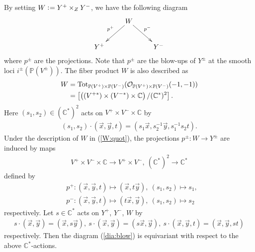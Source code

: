 \documentclass[11pt]{amsart}
\theoremstyle{plain}
\newcommand{\oO}{\mathcal{O}}
\begin{document}
By setting $W \cneq Y^+ \times_{Z} Y^-$, 
we have the following diagram
\begin{align}\label{dia:blow}
\xymatrix{
& W \ar[ld]_-{p^+} \ar[rd]^-{p^-} & \\
Y^+ & & Y^-
}
\end{align}
where $p^{\pm}$ are the projections. 
Note that $p^{\pm}$ are the blow-ups 
of $Y^{\pm}$
at the smooth loci
$i^{\pm}(\mathbb{P}(V^{\pm}))$. 
The fiber product $W$ is also described as 
\begin{align}\notag
W 
&=\mathrm{Tot}_{\mathbb{P}(V^+) \times \mathbb{P}(V^-)}(\oO_{\mathbb{P}(V^+) \times \mathbb{P}(V^-)}(-1, -1)) \\
\label{W:quot}
&=\left[ \left( (V^{+\ast} ) \times (V^{-\ast}) 
\times \mathbb{C} \right)/(\mathbb{C}^{\ast})^2  \right].
\end{align}
Here $(s_1, s_2) \in (\mathbb{C}^{\ast})^2$ acts on 
$V^{+} \times V^{-} \times \mathbb{C}$ by 
\begin{align*}
(s_1, s_2) \cdot (\vec{x}, \vec{y}, t)=(s_1 \vec{x},  s_2^{-1} \vec{y}, s_1^{-1} s_2 t). 
\end{align*}
Under the description of $W$ in (\ref{W:quot}), the projections
$p^{\pm} \colon W \to Y^{\pm}$ are induced by
maps
\begin{align*}
V^+ \times V^- \times \mathbb{C} \to V^+ \times V^-, \ 
(\mathbb{C}^{\ast})^2 \to \mathbb{C}^{\ast}
\end{align*}
defined by 
\begin{align*}
&p^+ \colon (\vec{x}, \vec{y}, t) \mapsto (\vec{x}, t\vec{y}), \ (s_1, s_2) \mapsto s_1, \\
&p^- \colon (\vec{x}, \vec{y}, t) \mapsto (t\vec{x}, \vec{y}), \ (s_1, s_2) 
\mapsto s_2
\end{align*}
respectively. 
Let $s \in \mathbb{C}^{\ast}$ acts on 
$Y^+$, $Y^-$, $W$
by
\begin{align}\label{act:C}
s \cdot (\vec{x}, \vec{y})=(\vec{x}, s\vec{y}), \ 
s \cdot (\vec{x}, \vec{y})=(s\vec{x}, \vec{y}), \ 
s \cdot (\vec{x}, \vec{y}, t)=(\vec{x}, \vec{y}, st)
\end{align}
respectively. 
Then the diagram (\ref{dia:blow}) is equivariant 
with respect to the above $\mathbb{C}^{\ast}$-actions. 
\end{document}
